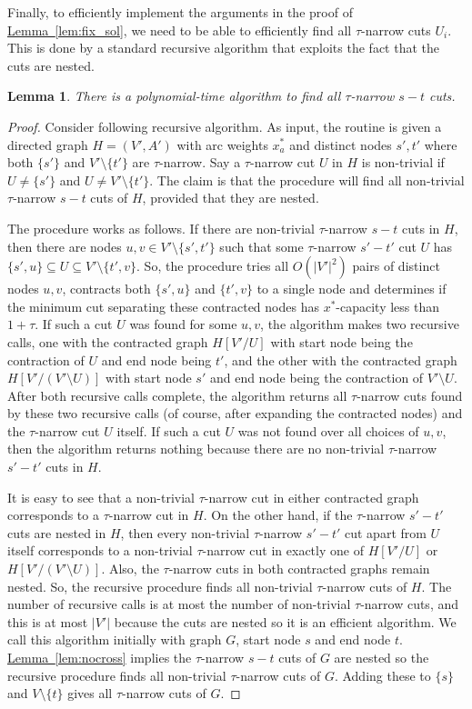 \documentclass[11pt]{article}
\newcommand{\lref}[2][]{\hyperref[#2]{#1~\ref*{#2}}}
\newtheorem{lemma}[theorem]{Lemma}
\theoremstyle{definition}
\begin{document}
Finally, to efficiently implement the arguments in the proof of \lref[Lemma]{lem:fix_sol}, we need to be able to efficiently find
all $\tau$-narrow cuts $U_i$.
This is done by a standard recursive algorithm that exploits the fact that the cuts are nested.
\begin{lemma} \label{lem:efficient}
There is a polynomial-time algorithm to find all $\tau$-narrow $s-t$ cuts.
\end{lemma}
\begin{proof}
Consider following recursive algorithm.
As input, the routine is given a directed graph $H = (V',A')$ with arc weights $x^*_a$
and distinct nodes $s',t'$  where both $\{s'\}$ and $V'\setminus \{t'\}$ are $\tau$-narrow.
Say a $\tau$-narrow cut $U$ in $H$ is non-trivial if $U \neq \{s'\}$ and $U \neq V' \setminus \{t'\}$.
The claim is that the procedure will find all non-trivial $\tau$-narrow $s-t$ cuts of $H$, provided that they are nested.

The procedure works as follows.
If there are non-trivial $\tau$-narrow $s-t$ cuts in $H$,
then there are nodes $u,v \in V' \setminus\{s',t'\}$ such that
some $\tau$-narrow $s'-t'$ cut $U$ has $\{s',u\} \subseteq U \subseteq V' \setminus \{t',v\}$.
So, the procedure tries all $O(|V'|^2)$ pairs of distinct nodes $u,v$, contracts both $\{s',u\}$ and $\{t',v\}$
to a single node and determines if the minimum cut separating these contracted nodes
has $x^*$-capacity less than $1+\tau$. If such a cut $U$ was found for some $u,v$, the algorithm makes two recursive calls,
one with the contracted graph $H[V'/U]$ with start node being the contraction of $U$ and end node being $t'$,
and the other with the contracted graph $H[V'/(V' \setminus U)]$ with start node $s'$ and end node being the contraction of $V'\setminus U$.
After both recursive calls complete, the algorithm returns all $\tau$-narrow
cuts found by these two recursive calls (of course, after expanding the contracted nodes)
and the $\tau$-narrow cut $U$ itself. If such a cut $U$ was not found over all choices of $u,v$, then the algorithm returns
nothing because there are no non-trivial $\tau$-narrow $s'-t'$ cuts in $H$.

It is easy to see that a non-trivial $\tau$-narrow cut in either contracted graph corresponds to a $\tau$-narrow cut in $H$.
On the other hand, if the $\tau$-narrow $s'-t'$ cuts are nested in $H$, then every non-trivial $\tau$-narrow $s'-t'$
cut apart from $U$ itself corresponds to a non-trivial $\tau$-narrow cut in exactly one of $H[V'/U]$ or
$H[V'/(V'\setminus U)]$. Also, the $\tau$-narrow cuts in both contracted graphs remain nested.
So, the recursive procedure finds all non-trivial $\tau$-narrow cuts of $H$. The number of recursive calls
is at most the number of non-trivial $\tau$-narrow cuts, and this is at most $|V'|$ because the cuts are nested
so it is an efficient algorithm. We call this algorithm initially with graph $G$, start node $s$ and end node $t$.
\lref[Lemma]{lem:nocross} implies the $\tau$-narrow $s-t$ cuts of $G$ are nested
so the recursive procedure finds all non-trivial $\tau$-narrow cuts of $G$. Adding these to
$\{s\}$ and $V\setminus\{t\}$ gives all $\tau$-narrow cuts of $G$.
\end{proof}
\end{document}
